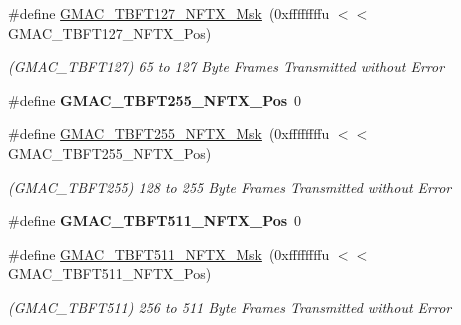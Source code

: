 \begin{DoxyCompactItemize}
\mbox{\label{group__SAMV71__GMAC_ga1a67e0faa3eb1c1df783b3bcebb0188d}} 
\#define \mbox{\hyperlink{group__SAMV71__GMAC_ga1a67e0faa3eb1c1df783b3bcebb0188d}{G\+M\+A\+C\+\_\+\+T\+B\+F\+T127\+\_\+\+N\+F\+T\+X\+\_\+\+Msk}}~(0xffffffffu $<$$<$ G\+M\+A\+C\+\_\+\+T\+B\+F\+T127\+\_\+\+N\+F\+T\+X\+\_\+\+Pos)
\begin{DoxyCompactList}\small\item\em (G\+M\+A\+C\+\_\+\+T\+B\+F\+T127) 65 to 127 Byte Frames Transmitted without Error \end{DoxyCompactList}\item 
\mbox{\label{group__SAMV71__GMAC_ga7034da8ced3947f91ab40ab6ad3a1fd9}} 
\#define {\bfseries G\+M\+A\+C\+\_\+\+T\+B\+F\+T255\+\_\+\+N\+F\+T\+X\+\_\+\+Pos}~0
\item 
\mbox{\label{group__SAMV71__GMAC_ga3dff860e340e6db2802ac967b38a8cca}} 
\#define \mbox{\hyperlink{group__SAMV71__GMAC_ga3dff860e340e6db2802ac967b38a8cca}{G\+M\+A\+C\+\_\+\+T\+B\+F\+T255\+\_\+\+N\+F\+T\+X\+\_\+\+Msk}}~(0xffffffffu $<$$<$ G\+M\+A\+C\+\_\+\+T\+B\+F\+T255\+\_\+\+N\+F\+T\+X\+\_\+\+Pos)
\begin{DoxyCompactList}\small\item\em (G\+M\+A\+C\+\_\+\+T\+B\+F\+T255) 128 to 255 Byte Frames Transmitted without Error \end{DoxyCompactList}\item 
\mbox{\label{group__SAMV71__GMAC_ga73804515d35a867335bcf8db05aa18d1}} 
\#define {\bfseries G\+M\+A\+C\+\_\+\+T\+B\+F\+T511\+\_\+\+N\+F\+T\+X\+\_\+\+Pos}~0
\item 
\mbox{\label{group__SAMV71__GMAC_ga2660fb762eb35ec0a1b97fa325df61d3}} 
\#define \mbox{\hyperlink{group__SAMV71__GMAC_ga2660fb762eb35ec0a1b97fa325df61d3}{G\+M\+A\+C\+\_\+\+T\+B\+F\+T511\+\_\+\+N\+F\+T\+X\+\_\+\+Msk}}~(0xffffffffu $<$$<$ G\+M\+A\+C\+\_\+\+T\+B\+F\+T511\+\_\+\+N\+F\+T\+X\+\_\+\+Pos)
\begin{DoxyCompactList}\small\item\em (G\+M\+A\+C\+\_\+\+T\+B\+F\+T511) 256 to 511 Byte Frames Transmitted without Error \end{DoxyCompactList}\item 
\mbox{\label{group__SAMV71__GMAC_ga35c50dea65101a60cbc1cd7752a77a95}} 
$$
\end{DoxyCompactItemize}

